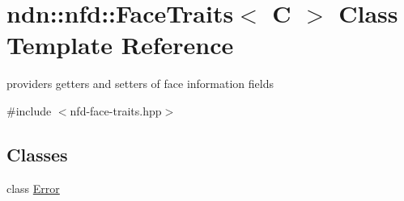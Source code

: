 \hypertarget{classndn_1_1nfd_1_1FaceTraits}{}\section{ndn\+:\+:nfd\+:\+:Face\+Traits$<$ C $>$ Class Template Reference}
\label{classndn_1_1nfd_1_1FaceTraits}


providers getters and setters of face information fields  




{\ttfamily \#include $<$nfd-\/face-\/traits.\+hpp$>$}

\subsection*{Classes}
\begin{DoxyCompactItemize}
\item 
class \hyperlink{classndn_1_1nfd_1_1FaceTraits_1_1Error}{Error}
\end{DoxyCompactItemize}
